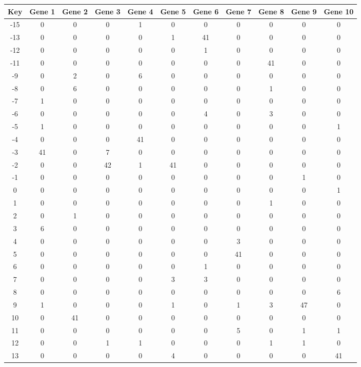\begin{tabular}{|c|c|c|c|c|c|c|c|c|c|c|}
\hline
Key & Gene 1 & Gene 2 & Gene 3 & Gene 4 & Gene 5 & Gene 6 & Gene 7 & Gene 8 & Gene 9 & Gene 10 \\
\hline
-15 & 0 & 0 & 0 & 1 & 0 & 0 & 0 & 0 & 0 & 0 \\
-13 & 0 & 0 & 0 & 0 & 1 & 41 & 0 & 0 & 0 & 0 \\
-12 & 0 & 0 & 0 & 0 & 0 & 1 & 0 & 0 & 0 & 0 \\
-11 & 0 & 0 & 0 & 0 & 0 & 0 & 0 & 41 & 0 & 0 \\
-9 & 0 & 2 & 0 & 6 & 0 & 0 & 0 & 0 & 0 & 0 \\
-8 & 0 & 6 & 0 & 0 & 0 & 0 & 0 & 1 & 0 & 0 \\
-7 & 1 & 0 & 0 & 0 & 0 & 0 & 0 & 0 & 0 & 0 \\
-6 & 0 & 0 & 0 & 0 & 0 & 4 & 0 & 3 & 0 & 0 \\
-5 & 1 & 0 & 0 & 0 & 0 & 0 & 0 & 0 & 0 & 1 \\
-4 & 0 & 0 & 0 & 41 & 0 & 0 & 0 & 0 & 0 & 0 \\
-3 & 41 & 0 & 7 & 0 & 0 & 0 & 0 & 0 & 0 & 0 \\
-2 & 0 & 0 & 42 & 1 & 41 & 0 & 0 & 0 & 0 & 0 \\
-1 & 0 & 0 & 0 & 0 & 0 & 0 & 0 & 0 & 1 & 0 \\
0 & 0 & 0 & 0 & 0 & 0 & 0 & 0 & 0 & 0 & 1 \\
1 & 0 & 0 & 0 & 0 & 0 & 0 & 0 & 1 & 0 & 0 \\
2 & 0 & 1 & 0 & 0 & 0 & 0 & 0 & 0 & 0 & 0 \\
3 & 6 & 0 & 0 & 0 & 0 & 0 & 0 & 0 & 0 & 0 \\
4 & 0 & 0 & 0 & 0 & 0 & 0 & 3 & 0 & 0 & 0 \\
5 & 0 & 0 & 0 & 0 & 0 & 0 & 41 & 0 & 0 & 0 \\
6 & 0 & 0 & 0 & 0 & 0 & 1 & 0 & 0 & 0 & 0 \\
7 & 0 & 0 & 0 & 0 & 3 & 3 & 0 & 0 & 0 & 0 \\
8 & 0 & 0 & 0 & 0 & 0 & 0 & 0 & 0 & 0 & 6 \\
9 & 1 & 0 & 0 & 0 & 1 & 0 & 1 & 3 & 47 & 0 \\
10 & 0 & 41 & 0 & 0 & 0 & 0 & 0 & 0 & 0 & 0 \\
11 & 0 & 0 & 0 & 0 & 0 & 0 & 5 & 0 & 1 & 1 \\
12 & 0 & 0 & 1 & 1 & 0 & 0 & 0 & 1 & 1 & 0 \\
13 & 0 & 0 & 0 & 0 & 4 & 0 & 0 & 0 & 0 & 41 \\
\hline
\end{tabular}